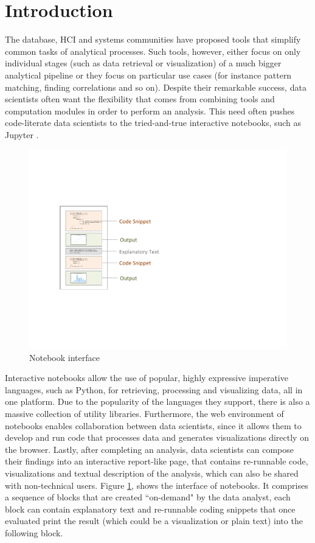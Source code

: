 \vspace*{-0.4cm}
\section{Introduction}
\label{section:introduction}




The database, HCI and systems communities have proposed tools that simplify common tasks of analytical processes. Such tools, however, either focus on only individual stages (such as data retrieval or visualization) of a much bigger analytical pipeline or they focus on particular use cases (for instance pattern matching, finding correlations and so on). Despite their remarkable success, data scientists often want the flexibility that comes from combining tools and computation modules in order to perform an analysis. This need often pushes code-literate data scientists to the tried-and-true interactive notebooks, such as Jupyter \cite{Jupyter}.


\begin{figure}[t]
  \centering
  \includegraphics[width=0.7\columnwidth]{figures/notebook2.pdf}
  \caption{Notebook interface}
  \vspace{-15pt}
\label{figure:notebook-interface}
\end{figure}

Interactive notebooks allow the use of popular, highly expressive imperative languages, such as Python, for retrieving, processing and visualizing data, all in one platform. Due to the popularity of the languages they support, there is also a massive collection of utility libraries. Furthermore, the web environment of notebooks enables collaboration between data scientists, since it allows them to develop and run code that processes data and generates visualizations directly on the browser. Lastly, after completing an analysis, data scientists can compose their findings into an interactive report-like page, that contains re-runnable code, visualizations and textual description of the analysis, which can also be shared with non-technical users. Figure \ref{figure:notebook-interface}, shows the interface of notebooks. It comprises a sequence of blocks that are created ``on-demand" by the data analyst, each block can contain explanatory text and re-runnable coding snippets that once evaluated print the result (which could be a visualization or plain text) into the following block. 

